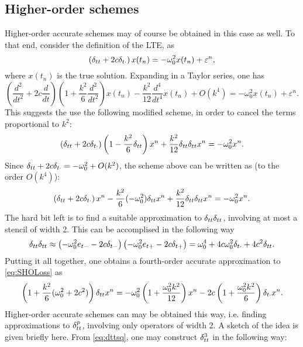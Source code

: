 \subsection{Higher-order schemes}
Higher-order accurate schemes may of course be obtained in this case as well. To that end, consider the definition of the LTE, as
\begin{equation}
    \left(\delta_{tt}+2c\delta_{t\cdot} \right) x(t_n) = - \omega_0^2 x(t_n) + \varepsilon^n,
\end{equation}
where $x(t_n)$ is the true solution. Expanding in a Taylor series, one has
\begin{equation}
    \left(\frac{d^2}{dt^2} + 2c \frac{d}{dt} \right)\left(1 + \frac{k^2}{6}\frac{d^2}{dt^2}\right)x(t_n) - \frac{k^2}{12}\frac{d^4}{dt^4}x(t_n) + O(k^4) = - \omega_0^2 x(t_n) + \varepsilon^n.
\end{equation}
This suggests the use the following modified scheme, in order to cancel the terms proportional to $k^2$:
\begin{equation}
    \left(\delta_{tt} + 2c \delta_{t\cdot} \right)\left(1 - \frac{k^2}{6}\delta_{tt}\right)x^n + \frac{k^2}{12}\delta_{tt}\delta_{tt} x^n = -\omega_0^2 x^n.
\end{equation}
Since $\delta_{tt} + 2c \delta_{t\cdot}  = -\omega_0^2 + O(k^2)$, the scheme above can be written as (to the order $O(k^4)$):
\begin{equation}
    \left(\delta_{tt} + 2c \delta_{t\cdot} \right)x^n - \frac{k^2}{6}(-\omega_0^2) \delta_{tt} x^n + \frac{k^2}{12}\delta_{tt} \delta_{tt} x^n = -\omega_0^2 x^n.
\end{equation}
The hard bit left is to find a suitable approximation to $\delta_{tt} \delta_{tt}$, involving at most a stencil of width 2. This can be accomplised in the following way
\begin{equation}\label{eq:dttsq}
    \delta_{tt} \delta_{tt} \approx \left(-\omega_0^2 e_{t-} -2c \delta_{t-} \right)\left(-\omega_0^2 e_{t+} -2c \delta_{t+} \right) = \omega_0^4 + 4c \omega_0^2 \delta_{t\cdot} + 4c^2 \delta_{tt}.
\end{equation}
Putting it all together, one obtains a fourth-order accurate approximation to \eqref{eq:SHOLoss} as
\begin{equation}
    \left(1 + \frac{k^2}{6}(\omega_0^2 + 2c^2) \right)\delta_{tt} x^n = -\omega_0^2\left(1 + \frac{\omega_0^2 k^2}{12} \right) x^n - 2c \left(1 + \frac{\omega_0^2k^2}{6} \right)\delta_{t\cdot} x^n.
\end{equation}
Higher-order accurate schemes can may be obtained this way, i.e. finding approximations to $\delta_{tt}^p$, involving only operators of width 2. A sketch of the idea is given briefly here. From \eqref{eq:dttsq}, one may construct $\delta_{tt}^3$ in the following way:
